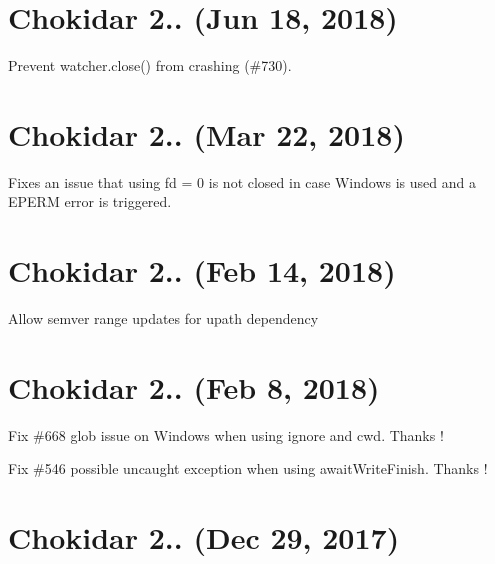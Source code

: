 \section*{Chokidar 2.. (Jun 18, 2018)}


\begin{DoxyItemize}
\item Prevent watcher.\+close() from crashing (\#730).
\end{DoxyItemize}

\section*{Chokidar 2.. (Mar 22, 2018)}


\begin{DoxyItemize}
\item Fixes an issue that using fd = 0 is not closed in case Windows is used and a {\ttfamily E\+P\+E\+RM} error is triggered.
\end{DoxyItemize}

\section*{Chokidar 2.. (Feb 14, 2018)}


\begin{DoxyItemize}
\item Allow semver range updates for upath dependency
\end{DoxyItemize}

\section*{Chokidar 2.. (Feb 8, 2018)}


\begin{DoxyItemize}
\item Fix \#668 glob issue on Windows when using {\ttfamily ignore} and {\ttfamily cwd}. Thanks !
\item Fix \#546 possible uncaught exception when using {\ttfamily await\+Write\+Finish}. Thanks !
\end{DoxyItemize}

\section*{Chokidar 2.. (Dec 29, 2017)}


